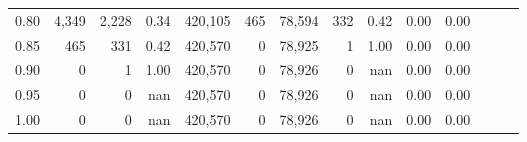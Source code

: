 \begin{tabular}{rrrrrrrrrrrrrr}
0.80 &   4,349 &   2,228 &  0.34 &  420,105 &      465 &  78,594 &     332 &  0.42 &  0.00 &      0.00 \\
0.85 &     465 &     331 &  0.42 &  420,570 &        0 &  78,925 &       1 &  1.00 &  0.00 &      0.00 \\
0.90 &       0 &       1 &  1.00 &  420,570 &        0 &  78,926 &       0 &   nan &  0.00 &      0.00 \\
0.95 &       0 &       0 &   nan &  420,570 &        0 &  78,926 &       0 &   nan &  0.00 &      0.00 \\
1.00 &       0 &       0 &   nan &  420,570 &        0 &  78,926 &       0 &   nan &  0.00 &      0.00 \\
\bottomrule
\end{tabular}
